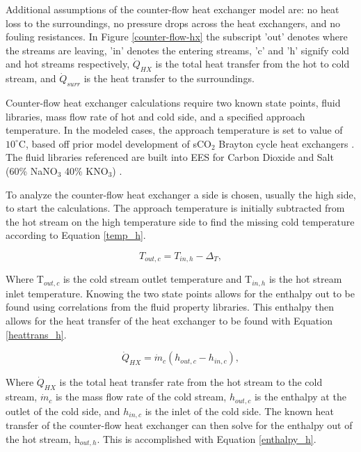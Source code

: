 \begin{paracol}{2}
\linenumbers
\switchcolumn

Additional assumptions of the counter-flow heat exchanger model are: no heat loss to the surroundings, no pressure drops across the heat exchangers, and no fouling resistances. In Figure \ref{counter-flow-hx} the subscript 'out' denotes where the streams are leaving, 'in' denotes the entering streams, 'c' and 'h' signify cold and hot streams respectively, $\dot{Q}_{HX}$ is the total heat transfer from the hot to cold stream, and $\dot{Q}_{surr}$ is the heat transfer to the surroundings.

Counter-flow heat exchanger calculations require two known state points, fluid libraries, mass flow rate of hot and cold side, and a specified approach temperature. In the modeled cases, the approach temperature is set to value of $10^{\circ}$C, based off prior model development of sCO$_{2}$ Brayton cycle heat exchangers \cite{seidel_2010_model_development}. The fluid libraries referenced are built into EES for Carbon Dioxide and Salt (60\% NaNO$_3$ 40\% KNO$_3$) \cite{pacheco_1995_salt_properties,roland_1996_co2_properties}. 

To analyze the counter-flow heat exchanger a side is chosen, usually the high side, to start the calculations. The approach temperature is initially subtracted from the hot stream on the high temperature side to find the missing cold temperature according to Equation \ref{temp_h}. 

\begin{equation}
   \label{temp_h}
    T_{out,c} = T_{in,h}-\Delta_{T},
\end{equation}

Where T$_{out,c}$ is the cold stream outlet temperature and T$_{in,h}$ is the hot stream inlet temperature. Knowing the two state points allows for the enthalpy out to be found using correlations from the fluid property libraries. This enthalpy then allows for the heat transfer of the heat exchanger to be found with Equation \ref{heattrans_h}.

\begin{equation}
    \label{heattrans_h}
     \dot{Q}_{HX} = \dot{m}_{c}(h_{out,c}-h_{in,c}),
 \end{equation}

 Where $\dot{Q}_{HX}$ is the total heat transfer rate from the hot stream to the cold stream, $\dot{m}_{c}$ is the mass flow rate of the cold stream, $h_{out,c}$ is the enthalpy at the outlet of the cold side, and $h_{in,c}$ is the inlet of the cold side.
 The known heat transfer of the counter-flow heat exchanger can then solve for the enthalpy out of the hot stream, h$_{out,h}$. This is accomplished with Equation \ref{enthalpy_h}.


\end{paracol}
